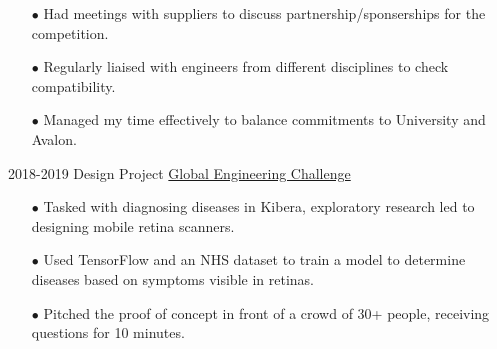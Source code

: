 \documentclass[9pt]{developercv} %
\begin{document}
\begin{entrylist}
{\begin{itemize}
					\item[$\bullet$\hspace*{0.5cm}] Had meetings with suppliers to discuss partnership/sponserships for the competition.
					\item[$\bullet$\hspace*{0.5cm}] Regularly liaised with engineers from different disciplines to check compatibility.
					\item[$\bullet$\hspace*{0.5cm}] Managed my time effectively to balance commitments to University and Avalon.
				\end{itemize}		
			}
			\entry
			{2018-2019}
			{Design Project}
			{\href{https://www.sheffield.ac.uk/engineering/study/global-engineering-challenge}{Global Engineering Challenge}}
			{
				\begin{itemize}
					\item[$\bullet$\hspace*{0.5cm}] Tasked with diagnosing diseases in Kibera, exploratory research led to designing mobile retina scanners. 
					\item[$\bullet$\hspace*{0.5cm}] Used TensorFlow and an NHS dataset to train a model to determine diseases based on symptoms visible in retinas.
					\item[$\bullet$\hspace*{0.5cm}] Pitched the proof of concept in front of a crowd of 30+ people, receiving questions for 10 minutes.
				\end{itemize}	
			}	
	\end{entrylist}
\end{document}
